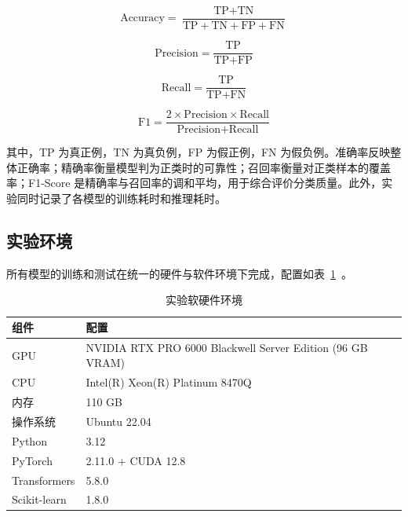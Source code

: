 \begin{equation}
    \text{Accuracy} = \frac{\text{TP} + \text{TN}}{\text{TP} + \text{TN} + \text{FP} + \text{FN}}
\end{equation}

\begin{equation}
    \text{Precision} = \frac{\text{TP}}{\text{TP} + \text{FP}}
    \label{eq:precision}
\end{equation}

\begin{equation}
    \text{Recall} = \frac{\text{TP}}{\text{TP} + \text{FN}}
    \label{eq:recall}
\end{equation}

\begin{equation}
    \text{F1} = \frac{2 \times \text{Precision} \times \text{Recall}}{\text{Precision} + \text{Recall}}
\end{equation}

其中，TP 为真正例，TN 为真负例，FP 为假正例，FN 为假负例。准确率反映整体正确率；精确率衡量模型判为正类时的可靠性；召回率衡量对正类样本的覆盖率；F1-Score 是精确率与召回率的调和平均，用于综合评价分类质量。此外，实验同时记录了各模型的训练耗时和推理耗时。

\subsection{实验环境}
\label{sec:environment}

所有模型的训练和测试在统一的硬件与软件环境下完成，配置如表~\ref{tab:env}~。

\begin{table}[htbp]
    \centering
    \caption{实验软硬件环境}
    \label{tab:env}
    \begin{tabular}{ll}
        \toprule
        组件 & 配置 \\
        \midrule
        GPU          & NVIDIA RTX PRO 6000 Blackwell Server Edition (96 GB VRAM) \\
        CPU          & Intel(R) Xeon(R) Platinum 8470Q \\
        内存         & 110 GB \\
        操作系统     & Ubuntu 22.04 \\
        Python       & 3.12 \\
        PyTorch      & 2.11.0 + CUDA 12.8 \\
        Transformers & 5.8.0 \\
        Scikit-learn & 1.8.0 \\
        \bottomrule
    \end{tabular}
\end{table}

